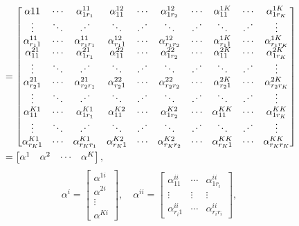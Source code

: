 \[
\begin{aligned}
&=\begin{bmatrix}
\alpha11&\cdots&\alpha_{1r_1}^{11}&\alpha_{11}^{12}&\cdots&\alpha_{1r_2}^{12}&\cdots&\alpha_{11}^{1K}&\cdots&\alpha_{1r_K}^{1K}\\
\vdots&\ddots&\chFourBIddots&\ddots&\chFourBIddots&\ddots&\chFourBIddots&\ddots&\chFourBIddots&\vdots\\
\alpha_{r_11}^{11}&\cdots&\alpha_{r_1r_1}^{11}&\alpha_{r_11}^{12}&\cdots&\alpha_{r_1r_2}^{12}&\cdots&\alpha_{r_11}^{1K}&\cdots&\alpha_{r_1r_K}^{1K}\\
\alpha_{11}^{21}&\cdots&\alpha_{1r_1}^{21}&\alpha_{11}^{22}&\cdots&\alpha_{1r_2}^{22}&\cdots&\alpha_{11}^{2K}&\cdots&\alpha_{1r_K}^{2K}\\
\vdots&\ddots&\chFourBIddots&\ddots&\chFourBIddots&\ddots&\chFourBIddots&\ddots&\chFourBIddots&\vdots\\
\alpha_{r_21}^{21}&\cdots&\alpha_{r_2r_1}^{21}&\alpha_{r_21}^{22}&\cdots&\alpha_{r_2r_2}^{22}&\cdots&\alpha_{r_21}^{2K}&\cdots&\alpha_{r_2r_K}^{2K}\\
\vdots&\ddots&\chFourBIddots&\ddots&\chFourBIddots&\ddots&\chFourBIddots&\ddots&\chFourBIddots&\vdots\\
\alpha_{11}^{K1}&\cdots&\alpha_{1r_1}^{K1}&\alpha_{11}^{K2}&\cdots&\alpha_{1r_2}^{K2}&\cdots&\alpha_{11}^{KK}&\cdots&\alpha_{1r_K}^{KK}\\
\vdots&\ddots&\chFourBIddots&\ddots&\chFourBIddots&\ddots&\chFourBIddots&\ddots&\chFourBIddots&\vdots\\
\alpha_{r_K1}^{K1}&\cdots&\alpha_{r_Kr_1}^{K1}&\alpha_{r_K1}^{K2}&\cdots&\alpha_{r_Kr_2}^{K2}&\cdots&\alpha_{r_K1}^{KK}&\cdots&\alpha_{r_Kr_K}^{KK}
\end{bmatrix}\\
&=\begin{bmatrix}\alpha^1&\alpha^2&\cdots&\alpha^K\end{bmatrix},
\end{aligned}
\]
\endgroup
\[
\alpha^i=\begin{bmatrix}\alpha^{1i}\\\alpha^{2i}\\\vdots\\\alpha^{Ki}\end{bmatrix},\quad
\alpha^{ii}=\begin{bmatrix}
\alpha_{11}^{ii}&\cdots&\alpha_{1r_i}^{ii}\\
\vdots&\vdots&\vdots\\\alpha_{r_i1}^{ii}&\cdots&\alpha_{r_ir_i}^{ii}
\end{bmatrix},
\]
